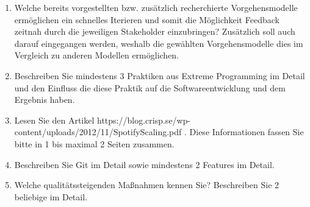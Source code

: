 \begin{enumerate}
    \item Welche bereits vorgestellten bzw. zusätzlich recherchierte Vorgehensmodelle ermöglichen ein
    schnelles Iterieren und somit die Möglichkeit Feedback zeitnah durch die jeweiligen Stakeholder
    einzubringen? Zusätzlich soll auch darauf eingegangen werden, weshalb die gewählten
    Vorgehensmodelle dies im Vergleich zu anderen Modellen ermöglichen. \\

	
    
    \item Beschreiben Sie mindestens 3 Praktiken aus Extreme Programming im Detail und den Einfluss
    die diese Praktik auf die Softwareentwicklung und dem Ergebnis haben.\\


    \item Lesen Sie den Artikel https://blog.crisp.se/wp-content/uploads/2012/11/SpotifyScaling.pdf .
    Diese Informationen fassen Sie bitte in 1 bis maximal 2 Seiten zusammen. \\

	

    \item Beschreiben Sie Git im Detail sowie mindestens 2 Features im Detail. \\
  


    \item Welche qualitätssteigenden Maßnahmen kennen Sie? Beschreiben Sie 2 beliebige im Detail. \\


	
\end{enumerate}

